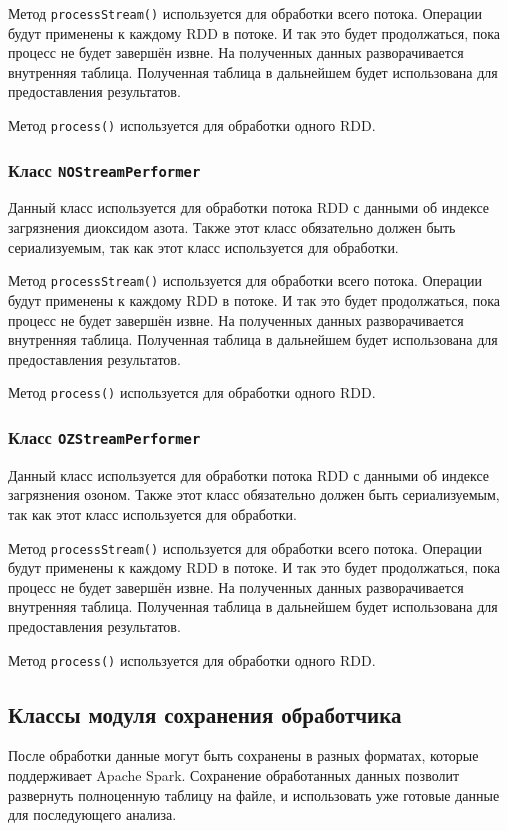 Метод \texttt{processStream()} используется для обработки всего потока.
Операции будут применены к каждому RDD в потоке.
И так это будет продолжаться, пока процесс не будет завершён извне.
На полученных данных разворачивается внутренняя таблица.
Полученная таблица в дальнейшем будет использована для предоставления результатов.

Метод \texttt{process()} используется для обработки одного RDD.


\subsubsection{Класс \texttt{NOStreamPerformer}}
Данный класс используется для обработки потока RDD с данными об индексе загрязнения диоксидом азота.
Также этот класс обязательно должен быть сериализуемым, так как этот класс используется для обработки.

Метод \texttt{processStream()} используется для обработки всего потока.
Операции будут применены к каждому RDD в потоке.
И так это будет продолжаться, пока процесс не будет завершён извне.
На полученных данных разворачивается внутренняя таблица.
Полученная таблица в дальнейшем будет использована для предоставления результатов.

Метод \texttt{process()} используется для обработки одного RDD.

\subsubsection{Класс \texttt{OZStreamPerformer}}
Данный класс используется для обработки потока RDD с данными об индексе загрязнения озоном.
Также этот класс обязательно должен быть сериализуемым, так как этот класс используется для обработки.

Метод \texttt{processStream()} используется для обработки всего потока.
Операции будут применены к каждому RDD в потоке.
И так это будет продолжаться, пока процесс не будет завершён извне.
На полученных данных разворачивается внутренняя таблица.
Полученная таблица в дальнейшем будет использована для предоставления результатов.

Метод \texttt{process()} используется для обработки одного RDD.


\subsection{Классы модуля сохранения обработчика}
После обработки данные могут быть сохранены в разных форматах, которые поддерживает Apache Spark.
Сохранение обработанных данных позволит развернуть полноценную таблицу на файле, и использовать уже готовые данные для последующего анализа.

